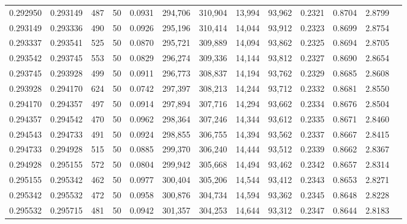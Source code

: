 \begin{tabular}{rrrrrrrrrrrrr}
0.292950 & 0.293149 &   487 &  50 &                                     0.0931 & 294,706 & 310,904 &  13,994 &  93,962 & 0.2321 & 0.8704 & 2.8799 \\
0.293149 & 0.293336 &   490 &  50 &                                     0.0926 & 295,196 & 310,414 &  14,044 &  93,912 & 0.2323 & 0.8699 & 2.8754 \\
0.293337 & 0.293541 &   525 &  50 &                                     0.0870 & 295,721 & 309,889 &  14,094 &  93,862 & 0.2325 & 0.8694 & 2.8705 \\
0.293542 & 0.293745 &   553 &  50 &                                     0.0829 & 296,274 & 309,336 &  14,144 &  93,812 & 0.2327 & 0.8690 & 2.8654 \\
0.293745 & 0.293928 &   499 &  50 &                                     0.0911 & 296,773 & 308,837 &  14,194 &  93,762 & 0.2329 & 0.8685 & 2.8608 \\
0.293928 & 0.294170 &   624 &  50 &                                     0.0742 & 297,397 & 308,213 &  14,244 &  93,712 & 0.2332 & 0.8681 & 2.8550 \\
0.294170 & 0.294357 &   497 &  50 &                                     0.0914 & 297,894 & 307,716 &  14,294 &  93,662 & 0.2334 & 0.8676 & 2.8504 \\
0.294357 & 0.294542 &   470 &  50 &                                     0.0962 & 298,364 & 307,246 &  14,344 &  93,612 & 0.2335 & 0.8671 & 2.8460 \\
0.294543 & 0.294733 &   491 &  50 &                                     0.0924 & 298,855 & 306,755 &  14,394 &  93,562 & 0.2337 & 0.8667 & 2.8415 \\
0.294733 & 0.294928 &   515 &  50 &                                     0.0885 & 299,370 & 306,240 &  14,444 &  93,512 & 0.2339 & 0.8662 & 2.8367 \\
0.294928 & 0.295155 &   572 &  50 &                                     0.0804 & 299,942 & 305,668 &  14,494 &  93,462 & 0.2342 & 0.8657 & 2.8314 \\
0.295155 & 0.295342 &   462 &  50 &                                     0.0977 & 300,404 & 305,206 &  14,544 &  93,412 & 0.2343 & 0.8653 & 2.8271 \\
0.295342 & 0.295532 &   472 &  50 &                                     0.0958 & 300,876 & 304,734 &  14,594 &  93,362 & 0.2345 & 0.8648 & 2.8228 \\
0.295532 & 0.295715 &   481 &  50 &                                     0.0942 & 301,357 & 304,253 &  14,644 &  93,312 & 0.2347 & 0.8644 & 2.8183 \\

\end{tabular}
